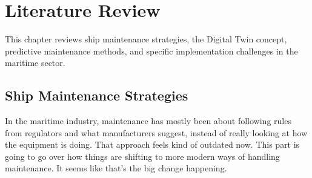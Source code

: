 \chapter{Literature Review}
\label{chapter:literature-review}

This chapter reviews ship maintenance strategies, the Digital Twin concept, predictive maintenance methods, and specific implementation challenges in the maritime sector.


\section{Ship Maintenance Strategies}
\label{section:maritime-maintenance}

In the maritime industry, maintenance has mostly been about following rules from regulators and what manufacturers suggest, instead of really looking at how the equipment is doing. That approach feels kind of outdated now. This part is going to go over how things are shifting to more modern ways of handling maintenance. It seems like that's the big change happening.
